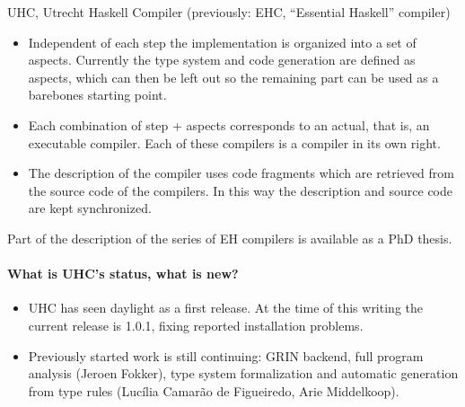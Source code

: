 \begin{hcarentry}{UHC, Utrecht Haskell Compiler (previously: EHC, ``Essential Haskell'' compiler)}
\begin{itemize}
\item
   Independent of each step the implementation is organized into a set of aspects.
   Currently the type system and code generation are defined as aspects,
   which can then be left out so the remaining part can be used as a barebones starting point.

\item
   Each combination of step + aspects corresponds to an actual, that is, an executable compiler.
   Each of these compilers is a compiler in its own right.

\item
   The description of the compiler uses code fragments which are
   retrieved from the source code of the compilers.
   In this way the description and source code are kept synchronized.
\end{itemize}

Part of the description of the series of EH compilers is available
as a PhD thesis.

\paragraph{What is UHC's status, what is new?}
\begin{itemize}
\item
   UHC has seen daylight as a first release.
   At the time of this writing the current release is 1.0.1, fixing reported installation problems.
\item
   Previously started work is still continuing: GRIN backend, full program analysis (Jeroen Fokker),
   type system formalization and automatic generation from type rules
   (Luc\'ilia Camar\~ao de Figueiredo, Arie Middelkoop).
\end{itemize}


\end{hcarentry}
